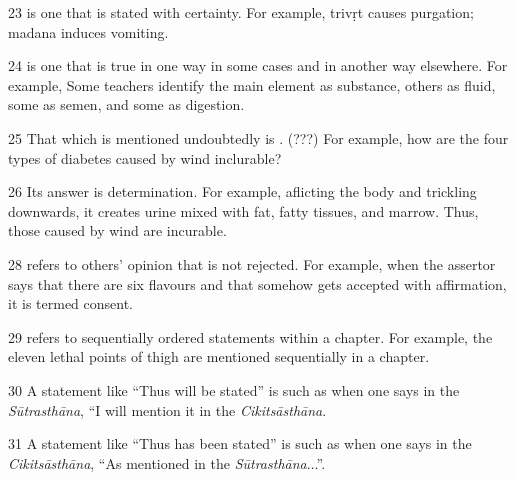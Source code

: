 \begin{translation}
\item [23]  is one that is stated with certainty. For example, \gls{trivṛt} causes purgation; \gls{madana} induces vomiting.

\item [24]  is one that is true in one way in some cases and in another way elsewhere. For example, Some teachers identify the main element as substance, others as fluid, some as semen, and some as digestion. 

\item [25] That which is mentioned undoubtedly is . (???) For example, how are the four types of diabetes caused by wind inclurable?

\item [26] Its answer is determination. For example, aflicting the body and trickling downwards, it creates urine mixed with fat, fatty tissues, and marrow. Thus, those caused by wind are incurable. 

\item [28]  refers to others' opinion that is not rejected. For example, when the assertor says that there are six flavours and that somehow gets accepted with affirmation, it is termed consent.

\item [29]  refers to sequentially ordered statements within a chapter. For example, the eleven lethal points of thigh are mentioned sequentially in a chapter.

\item [30] A statement like “Thus will be stated” is  such as when one says in the \emph{Sūtrasthāna}, “I will mention it in the \emph{Cikitsāsthāna}. 

\item [31] A statement like “Thus has been stated” is  such as when one says in the \emph{Cikitsāsthāna}, ``As mentioned in the \emph{Sūtrasthāna}...''. 

\end{translation}
